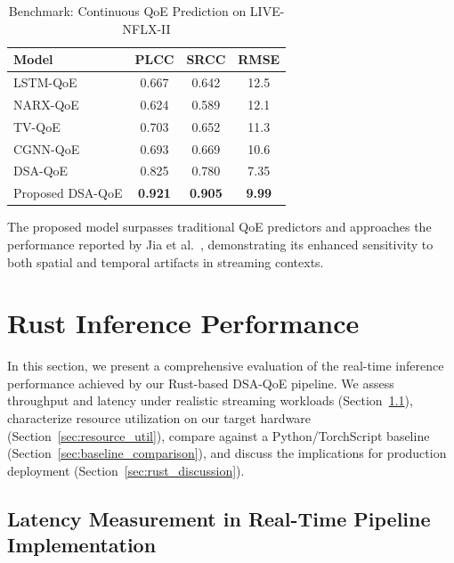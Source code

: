\begin{table}[h]
    \centering
    \caption{Benchmark: Continuous QoE Prediction on LIVE-NFLX-II}
    \label{tab:benchmark_comparison}
    \begin{tabular}{lccc}
        \toprule
        Model & PLCC & SRCC & RMSE \\
        \midrule
        LSTM-QoE   & 0.667 & 0.642 & 12.5 \\
        NARX-QoE   & 0.624 & 0.589 & 12.1 \\
        TV-QoE     & 0.703 & 0.652 & 11.3 \\
        CGNN-QoE   & 0.693 & 0.669 & 10.6 \\
        DSA-QoE~\cite{jia2024continuous} & 0.825 & 0.780 & 7.35 \\
        Proposed DSA-QoE & \textbf{0.921} & \textbf{0.905} & \textbf{9.99} \\
        \bottomrule
    \end{tabular}
\end{table}

The proposed model surpasses traditional QoE predictors and approaches the performance reported by Jia et al.~\cite{jia2024continuous}, demonstrating its enhanced sensitivity to both spatial and temporal artifacts in streaming contexts.

\section{Rust Inference Performance}
\label{sec:rust-performance}

In this section, we present a comprehensive evaluation of the real-time inference performance achieved by our Rust-based DSA-QoE pipeline.  
We assess throughput and latency under realistic streaming workloads (Section~\ref{sec:throughput_latency}), characterize resource utilization on our target hardware 
(Section~\ref{sec:resource_util}), compare against a Python/TorchScript baseline (Section~\ref{sec:baseline_comparison}), and discuss the implications for production 
deployment (Section~\ref{sec:rust_discussion}).

\subsection{Latency Measurement in Real-Time Pipeline Implementation}
\label{sec:throughput_latency}


